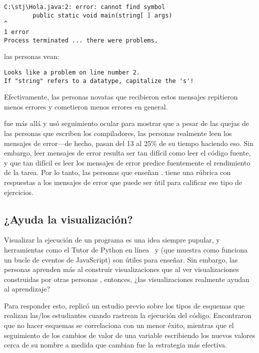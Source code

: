 \begin{verbatim}
C:\stj\Hola.java:2: error: cannot find symbol
        public static void main(string[ ] args)
^
1 error
Process terminated ... there were problems.
\end{verbatim}

\noindent
las personas vean:

\begin{verbatim}
Looks like a problem on line number 2.
If "string" refers to a datatype, capitalize the 's'!
\end{verbatim}

\noindent
Efectivamente,
las personas novatas que recibieron estos mensajes repitieron menos errores y cometieron menos errores en general.

\cite{Bari2017} fue más allá y usó seguimiento ocular para mostrar que
a pesar de las quejas de las personas que escriben los compiladores,
las personas realmente leen los mensajes de error---de hecho, pasan del 13 al 25\% de su tiempo haciendo eso.
Sin embargo,
leer mensajes de error resulta ser tan difícil como leer el código fuente,
y que tan difícil es leer los mensajes de error predice fuentemente el rendimiento de la tarea.
Por lo tanto, las personas que enseñan
.
\cite{Marc2011} tiene una rúbrica con respuestas a los mensajes de error que puede ser útil para calificar ese tipo de ejercicios.

\subsection*{¿Ayuda la visualización?}

Visualizar la ejecución de un programa es una idea siempre pupular,
y herramientas como el Tutor de Python en línea~\cite{Guo2013}
y 
(que muestra como funciona un bucle de eventos de JavaScript)
son útiles para enseñar.
Sin embargo,
las personas aprenden más al construir visualizaciones
que al ver visualizaciones construidas por otras personas \cite{Stas1998,Ceti2016},
entonces, ¿las visualizaciones realmente ayudan al aprendizaje?

Para responder esto,
\cite{Cunn2017} replicó un estudio previo sobre los tipos de esquemas que realizan las/los estudiantes cuando rastrean la ejecución del código.
Encontraron que no hacer esquemas se correlaciona con un menor éxito,
mientras que el seguimiento de los cambios de valor de una variable escribiendo los nuevos valores cerca de su nombre
a medida que cambian fue la estrategia más efectiva.

